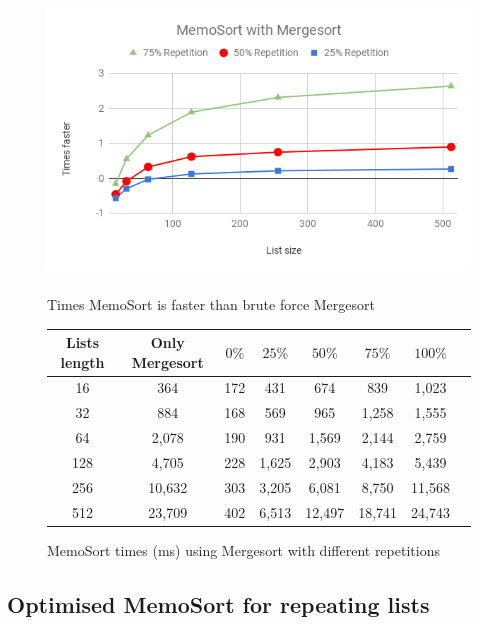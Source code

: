 \documentclass[a4paper,12pt]{article}
\begin{document}
\begin{figure}[H]
    \centering
    \includegraphics[height=8cm,keepaspectratio]{./images/MemoSortMerge.png}
    \caption{Times MemoSort is faster than brute force Mergesort }
    \label{fig:MemoSortMergeGraph}
\end{figure}


\begin{figure}[H]
\centering
\begin{tabular}{|c|c|c|c|c|c|c|c|}  \toprule
	{Lists length} & {Only Mergesort} & {$0\%$} & {$25\%$} & {$50\%$} & {$75\%$} & {$100\%$} \\ \midrule
	16 &364&172&431 & 674 & 839 & 1,023\\ 
	32 &884&168&569 & 965& 1,258& 1,555\\ 
	64 &2,078&190 &931&1,569&2,144&2,759\\ 
	128 &4,705&228&1,625&2,903&4,183&5,439\\ 
	256 &10,632&303&3,205&6,081&8,750&11,568\\ 
	512 &23,709& 402&6,513&12,497&18,741&24,743\\ \bottomrule
\end{tabular}
\caption{MemoSort times (ms) using Mergesort with different repetitions}
\label{ref:MemoSortMergeTable}
\end{figure}

\subsection{Optimised MemoSort for repeating lists}
\end{document}
